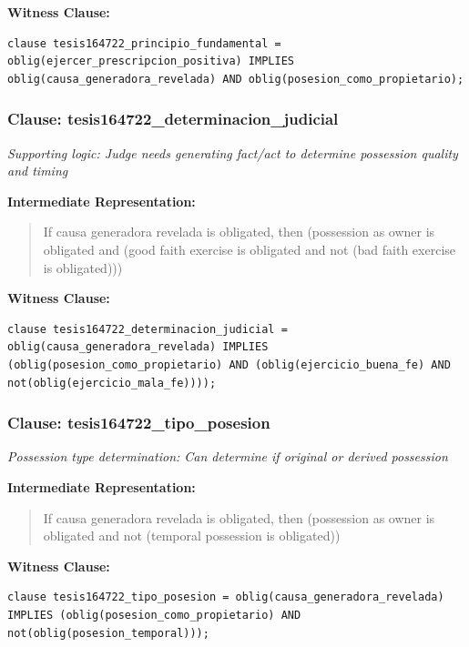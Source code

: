 \documentclass[11pt,a4paper]{article}
\begin{document}
\textbf{Witness Clause:}

\begin{lstlisting}[style=witnessstyle, language=Witness]
clause tesis164722_principio_fundamental = oblig(ejercer_prescripcion_positiva) IMPLIES oblig(causa_generadora_revelada) AND oblig(posesion_como_propietario);
\end{lstlisting}

\subsubsection{Clause: tesis164722\_determinacion\_judicial}

\textit{Supporting logic: Judge needs generating fact/act to determine possession quality and timing}

\textbf{Intermediate Representation:}

\begin{quote}
If causa generadora revelada is obligated, then (possession as owner is obligated and (good faith exercise is obligated and not (bad faith exercise is obligated)))
\end{quote}

\textbf{Witness Clause:}

\begin{lstlisting}[style=witnessstyle, language=Witness]
clause tesis164722_determinacion_judicial = oblig(causa_generadora_revelada) IMPLIES (oblig(posesion_como_propietario) AND (oblig(ejercicio_buena_fe) AND not(oblig(ejercicio_mala_fe))));
\end{lstlisting}

\subsubsection{Clause: tesis164722\_tipo\_posesion}

\textit{Possession type determination: Can determine if original or derived possession}

\textbf{Intermediate Representation:}

\begin{quote}
If causa generadora revelada is obligated, then (possession as owner is obligated and not (temporal possession is obligated))
\end{quote}

\textbf{Witness Clause:}

\begin{lstlisting}[style=witnessstyle, language=Witness]
clause tesis164722_tipo_posesion = oblig(causa_generadora_revelada) IMPLIES (oblig(posesion_como_propietario) AND not(oblig(posesion_temporal)));
\end{lstlisting}
\end{document}

